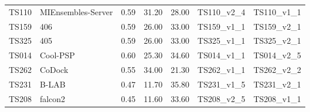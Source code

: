 \begin{table}[ht]
{\begin{tabular}{llrrrll}
TS110 & MIEnsembles-Server & 0.59 & 31.20 & 28.00 & TS110\_v2\_4 & TS110\_v1\_1 \\ 
TS159 & 406 & 0.59 & 26.00 & 33.00 & TS159\_v1\_1 & TS159\_v2\_1 \\ 
TS325 & 405 & 0.59 & 26.00 & 33.00 & TS325\_v1\_1 & TS325\_v2\_1 \\ 
TS014 & Cool-PSP & 0.60 & 25.30 & 34.60 & TS014\_v1\_1 & TS014\_v2\_5 \\ 
TS262 & CoDock & 0.55 & 34.00 & 21.30 & TS262\_v1\_1 & TS262\_v2\_2 \\ 
TS231 & B-LAB & 0.47 & 11.70 & 35.80 & TS231\_v1\_5 & TS231\_v2\_1 \\ 
TS208 & falcon2 & 0.45 & 11.60 & 33.60 & TS208\_v2\_5 & TS208\_v1\_1 \\ 
\bottomrule
\end{tabular}%
}
\end{table}
